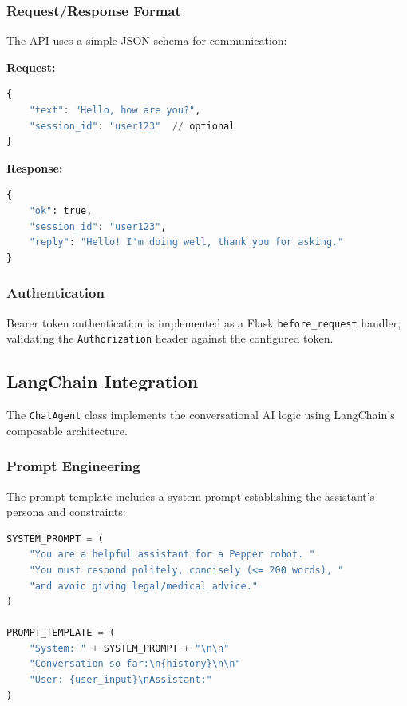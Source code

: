 \documentclass[a4paper]{article}
\begin{document}
\subsubsection{Request/Response Format}

The API uses a simple JSON schema for communication:

\textbf{Request:}
\begin{lstlisting}[language=Python, caption={API request JSON schema}]
{
    "text": "Hello, how are you?",
    "session_id": "user123"  // optional
}
\end{lstlisting}

\textbf{Response:}
\begin{lstlisting}[language=Python, caption={API response JSON schema}]
{
    "ok": true,
    "session_id": "user123",
    "reply": "Hello! I'm doing well, thank you for asking."
}
\end{lstlisting}

\subsubsection{Authentication}
Bearer token authentication is implemented as a Flask \texttt{before\_request} handler, validating the \texttt{Authorization} header against the configured token.

\subsection{LangChain Integration}
\label{subsec:langchain}

The \texttt{ChatAgent} class implements the conversational AI logic using LangChain's composable architecture.

\subsubsection{Prompt Engineering}

The prompt template includes a system prompt establishing the assistant's persona and constraints:

\begin{lstlisting}[language=Python, caption={System prompt and template in chain.py}, label=lst:prompt]
SYSTEM_PROMPT = (
    "You are a helpful assistant for a Pepper robot. "
    "You must respond politely, concisely (<= 200 words), "
    "and avoid giving legal/medical advice."
)

PROMPT_TEMPLATE = (
    "System: " + SYSTEM_PROMPT + "\n\n"
    "Conversation so far:\n{history}\n\n"
    "User: {user_input}\nAssistant:"
)
\end{lstlisting}
\end{document}
